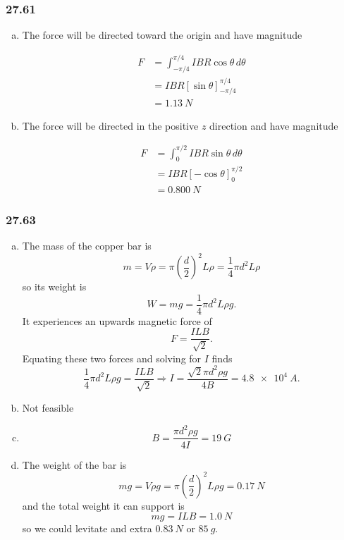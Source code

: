\documentclass{article}
\begin{document}
\subsubsection{27.61}

\begin{enumerate}[(a)]
  \item The force will be directed toward the origin and have magnitude

        \begin{align*}
          F & = \int_{-\pi / 4}^{\pi / 4} I B R \cos \theta \,d\theta \\
            & = I B R [\sin \theta]_{-\pi / 4}^{\pi / 4}              \\
            & = \qty{1.13}{N}
        \end{align*}

  \item The force will be directed in the positive $z$ direction and have magnitude

        \begin{align*}
          F & = \int_0^{\pi / 2} I B R \sin \theta \,d\theta \\
            & = I B R [-\cos \theta]_0^{\pi / 2}             \\
            & = \qty{0.800}{N}
        \end{align*}
\end{enumerate}

\subsubsection{27.63}

\begin{enumerate}[(a)]
  \item The mass of the copper bar is \[m = V \rho = \pi \left( \frac{d}{2} \right)^2 L \rho = \frac{1}{4} \pi d^2 L \rho\] so its weight is \[W = m g = \frac{1}{4} \pi d^2 L \rho g.\] It experiences an upwards magnetic force of \[F = \frac{I L B}{\sqrt{2}}.\] Equating these two forces and solving for $I$ finds \[\frac{1}{4} \pi d^2 L \rho g = \frac{I L B}{\sqrt{2}} \Rightarrow I = \frac{\sqrt{2} \pi d^2 \rho g}{4 B} = \qty{4.8e4}{A}.\]

  \item Not feasible

  \item \[B = \frac{\pi d^2 \rho g}{4 I} = \qty{19}{G}\]

  \item The weight of the bar is \[m g = V \rho g = \pi \left( \frac{d}{2} \right)^2 L \rho g = \qty{0.17}{N}\] and the total weight it can support is \[mg = I L B = \qty{1.0}{N}\] so we could levitate and extra $\qty{0.83}{N}$ or $\qty{85}{g}$.
\end{enumerate}
\end{document}
